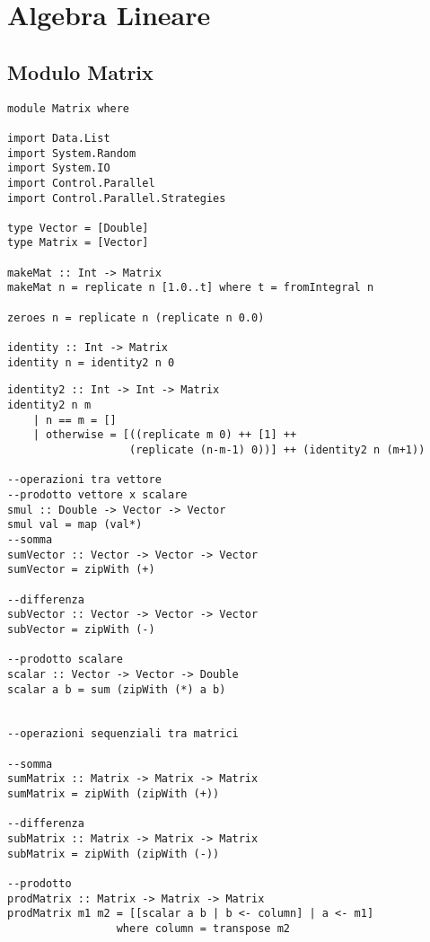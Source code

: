 \section{Algebra Lineare}
\subsection{Modulo Matrix}
\begin{verbatim}
module Matrix where

import Data.List
import System.Random
import System.IO
import Control.Parallel
import Control.Parallel.Strategies
    
type Vector = [Double]
type Matrix = [Vector]    

makeMat :: Int -> Matrix
makeMat n = replicate n [1.0..t] where t = fromIntegral n

zeroes n = replicate n (replicate n 0.0)

identity :: Int -> Matrix
identity n = identity2 n 0
\end{verbatim}
\newpage
\begin{verbatim}
identity2 :: Int -> Int -> Matrix
identity2 n m 
    | n == m = []
    | otherwise = [((replicate m 0) ++ [1] ++ 
                   (replicate (n-m-1) 0))] ++ (identity2 n (m+1))  

--operazioni tra vettore
--prodotto vettore x scalare
smul :: Double -> Vector -> Vector
smul val = map (val*)
--somma
sumVector :: Vector -> Vector -> Vector
sumVector = zipWith (+)

--differenza
subVector :: Vector -> Vector -> Vector
subVector = zipWith (-)

--prodotto scalare                      
scalar :: Vector -> Vector -> Double
scalar a b = sum (zipWith (*) a b)


--operazioni sequenziali tra matrici

--somma 
sumMatrix :: Matrix -> Matrix -> Matrix
sumMatrix = zipWith (zipWith (+))

--differenza
subMatrix :: Matrix -> Matrix -> Matrix
subMatrix = zipWith (zipWith (-))

--prodotto
prodMatrix :: Matrix -> Matrix -> Matrix
prodMatrix m1 m2 = [[scalar a b | b <- column] | a <- m1]
                 where column = transpose m2
\end{verbatim}
\newpage
